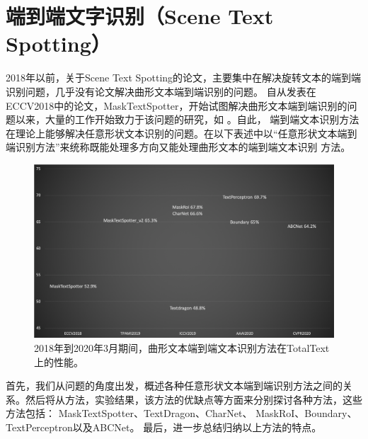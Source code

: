 % 
\chapter{端到端文字识别（Scene Text Spotting）}


2018年以前，关于Scene Text Spotting的论文\cite{liu2018fots}，主要集中在解决旋转文本的端到端识别问题，几乎没有论文解决曲形文本端到端识别的问题。
自从发表在ECCV2018中的论文，MaskTextSpotter\cite{lyu2018mask}，开始试图解决曲形文本端到端识别的问题以来，大量的工作开始致力于该问题的研究，如
\cite{lyu2018mask,liao2019mask,Feng_2019_ICCV,Xing_2019_ICCV,qin2019towards,wang2019all,liu2020abcnet,qiao2020text}。自此，
端到端文本识别方法在理论上能够解决任意形状文本识别的问题。在以下表述中以“任意形状文本端到端识别方法”来统称既能处理多方向又能处理曲形文本的端到端文本识别
方法。

\begin{figure}[H]
    \centering
    \includegraphics[width=.98\textwidth]{figure/spotting/trends.png} 
    \caption{2018年到2020年3月期间，曲形文本端到端文本识别方法在TotalText上的性能。} 
    \label{spotting_tends} 
\end{figure}

首先，我们从问题的角度出发，概述各种任意形状文本端到端识别方法之间的关系。然后将从方法，实验结果，该方法的优缺点等方面来分别探讨各种方法，这些方法包括：
MaskTextSpotter\cite{lyu2018mask,liao2019mask}、TextDragon\cite{Feng_2019_ICCV}、CharNet\cite{Xing_2019_ICCV}、
MaskRoI\cite{qin2019towards}、Boundary\cite{wang2019all}、TextPerceptron\cite{qiao2020text}以及ABCNet\cite{liu2020abcnet}。
最后，进一步总结归纳以上方法的特点。






